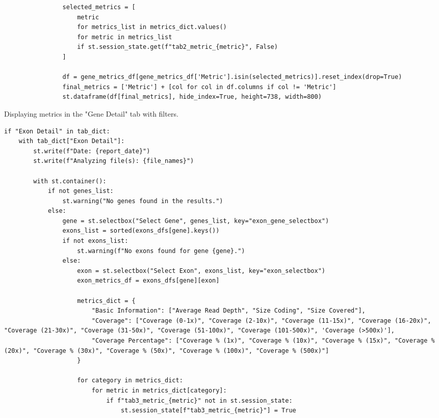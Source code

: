 \begin{longlisting}
\begin{verbatim}
                selected_metrics = [
                    metric
                    for metrics_list in metrics_dict.values()
                    for metric in metrics_list
                    if st.session_state.get(f"tab2_metric_{metric}", False)
                ]

                df = gene_metrics_df[gene_metrics_df['Metric'].isin(selected_metrics)].reset_index(drop=True)
                final_metrics = ['Metric'] + [col for col in df.columns if col != 'Metric']
                st.dataframe(df[final_metrics], hide_index=True, height=738, width=800)
\end{verbatim}
\caption{Displaying metrics in the "Gene Detail" tab with filters.}
\label{lbl:results10}
\end{longlisting}

\begin{longlisting}
\begin{verbatim}
if "Exon Detail" in tab_dict:
    with tab_dict["Exon Detail"]:
        st.write(f"Date: {report_date}")
        st.write(f"Analyzing file(s): {file_names}")
        
        with st.container():
            if not genes_list:
                st.warning("No genes found in the results.")
            else:
                gene = st.selectbox("Select Gene", genes_list, key="exon_gene_selectbox")
                exons_list = sorted(exons_dfs[gene].keys())
                if not exons_list:
                    st.warning(f"No exons found for gene {gene}.")
                else:
                    exon = st.selectbox("Select Exon", exons_list, key="exon_selectbox")
                    exon_metrics_df = exons_dfs[gene][exon]

                    metrics_dict = {
                        "Basic Information": ["Average Read Depth", "Size Coding", "Size Covered"],
                        "Coverage": ["Coverage (0-1x)", "Coverage (2-10x)", "Coverage (11-15x)", "Coverage (16-20x)", "Coverage (21-30x)", "Coverage (31-50x)", "Coverage (51-100x)", "Coverage (101-500x)", 'Coverage (>500x)'],
                        "Coverage Percentage": ["Coverage % (1x)", "Coverage % (10x)", "Coverage % (15x)", "Coverage % (20x)", "Coverage % (30x)", "Coverage % (50x)", "Coverage % (100x)", "Coverage % (500x)"]
                    }

                    for category in metrics_dict:
                        for metric in metrics_dict[category]:
                            if f"tab3_metric_{metric}" not in st.session_state:
                                st.session_state[f"tab3_metric_{metric}"] = True


\end{verbatim}
\end{longlisting}

